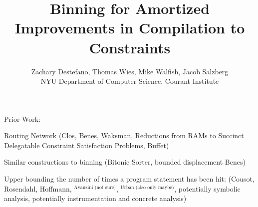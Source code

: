 \documentclass[letterpaper,10pt,twocolumn]{article}
\theoremstyle{definition}
\begin{document}
\title{Binning for Amortized Improvements in Compilation to Constraints}


\author{\rm{Zachary Destefano, Thomas Wies, Mike Walfish, Jacob Salzberg} \vspace{.5pc}\\
\rm{NYU Department of Computer Science, Courant Institute}}

\date{}
\maketitle

\textbf{}

Prior Work:

Routing Network (Clos, Benes, Waksman, Reductions from RAMs to Succinct Delegatable Constraint Satisfaction Problems, Buffet)

Similar constructions to binning (Bitonic Sorter, bounded displacement Benes)

Upper bounding the number of times a program statement has been hit:
(Cousot, Rosendahl, Hoffmann, $^{\mbox{Avanzini (not sure)}}$, $^{\mbox{Urban (also only maybe)}}$,
potentially symbolic analysis, potentially instrumentation and concrete analysis)


% 
% 

% 
% 
% 
% 
% 
% 

% 
\end{document}
